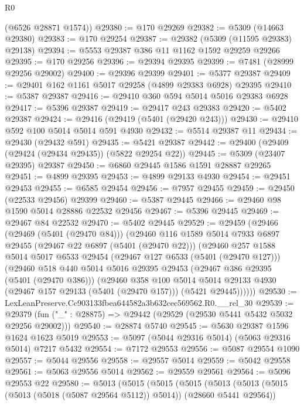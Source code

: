 \begin{lexlean}{R0}
\begin{coremodule}
      (@6526 @28871 @1574))
@29380 := @170 @29269
@29382 := @5309 (@14663 @29380)
@29383 := @170 @29254
@29387 := @29382 (@5309 (@11595 @29383) @29138)
@29394 := @5553 @29387 @386 @11 @1162 @1592 @29259 @29266
@29395 := @170 @29256
@29396 := @29394 @29395
@29399 := @7481 (@28999 @29256 @29002)
@29400 := @29396 @29399
@29401 := @5377 @29387
@29409 := @29401 @162 @1161 @5017 @29258 (@4899 @29383 @6928) @29395
@29410 := @5387 @29387
@29416 := @29410 @360 @594 @5014 @5016 @29383 @6928
@29417 := @5396 @29387
@29419 := @29417 @243 @29383
@29420 := @5402 @29387
@29424 := @29416 (@29419 (@5401 (@29420 @243)))
@29430 := @29410 @592 @100 @5014 @5014 @591 @4930
@29432 := @5514 @29387 @11
@29434 := @29430 (@29432 @591)
@29435 := @5421 @29387
@29442 := @29400 (@29409 (@29424 (@29434 @29435)) (@5822 @29254 @22))
@29445 := @5309 (@23407 @29395) @29387
@29450 := @6860 @29445 @1586 @1591 @28887 @29265
@29451 := @4899 @29395
@29453 := @4899 @29133 @4930
@29454 := @29451 @29453
@29455 := @6585 @29454
@29456 := @7957 @29455
@29459 := @29450 (@22533 @29456) @29399
@29460 := @5387 @29445
@29466 := @29460 @98 @1590 @5014 @28886 @22532 @29456
@29467 := @5396 @29445
@29469 := @29467 @84 @22532
@29470 := @5402 @29445
@29529 := @29459
    (@29466
      (@29469 (@5401 (@29470 @84)))
      (@29460
        @116
        @1589
        @5014
        @7933
        @6897
        @29455
        (@29467 @22 @6897 (@5401 (@29470 @22)))
        (@29460
          @257
          @1588
          @5014
          @5017
          @6533
          @29454
          (@29467 @127 @6533 (@5401 (@29470 @127)))
          (@29460
            @518
            @440
            @5014
            @5016
            @29395
            @29453
            (@29467 @386 @29395 (@5401 (@29470 @386)))
            (@29460
              @358
              @100
              @5014
              @5014
              @29133
              @4930
              (@29467 @157 @29133 (@5401 (@29470 @157)))
              (@5421 @29445))))))
@29530 := LexLeanPreserve.Cc903133fbea644582a3b632cec569562.R0.__rel_30
@29539 := @29379 (fun ("_" : @28875) => @29442 (@29529 (@29530 @5441 @5432 @5032 @29256 @29002)))
@29540 := @28874 @5740
@29545 := @5630 @29387 @1596 @1624 @1623 @5019
@29553 := @5097 (@5044 @29316 @5014) (@5063 @29316 @5014) @7217 @5432
@29554 := @7172 @29553
@29556 := @5087 @29554 @1090
@29557 := @5044 @29556
@29558 := @29557 @5014
@29559 := @5042 @29558
@29561 := @5063 @29556 @5014
@29562 := @29559 @29561
@29564 := @5096 @29553 @22
@29580 := @5013
    (@5015
      (@5015
        (@5015
          (@5013
            (@5013 (@5015 (@5013 (@5018 (@5087 @29564 @5112)) @5014)) (@28660 @5441 @29564))

\end{coremodule}
\end{lexlean}

